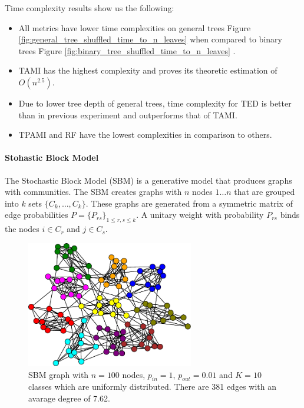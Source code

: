 Time complexity results show us the following:

\begin{itemize}
	\item All metrics have lower time complexities on general trees Figure \ref{fig:general_tree_shuffled_time_to_n_leaves} when compared to binary trees Figure \ref{fig:binary_tree_shuffled_time_to_n_leaves} .
	\item TAMI has the highest complexity and proves its theoretic estimation of $O(n^{2.5})$.
	\item Due to lower tree depth of general trees, time complexity for TED is better than in previous experiment and outperforms that of TAMI.  
	\item TPAMI and RF have the lowest complexities in comparison to others.
\end{itemize}

\paragraph{Stohastic Block Model}
\label{experiment_sbm}

The Stochastic Block Model (SBM) is a generative model that produces graphs with communities. The SBM creates graphs with $n$ nodes $1 \dots n$ that are grouped into $k$ sets $\{C_k, \dots, C_k\}$.
These graphs are generated from a symmetric matrix of edge probabilities $P = \{P_{rs} \}_{1\leq r,s \leq k}$. A unitary weight with probability $P_{rs}$ binds the nodes $i \in C_r$ and $j \in C_s$. 

\begin{figure}[H]
	\begin{center}
		\includegraphics[width=0.65\textwidth]{figures/2-block-model-sbm-graph.pdf}
		\caption{SBM graph with $n=100$ nodes, $p_{in}=1$, $p_{out}=0.01$ and $K=10$ classes which are uniformly distributed. There are 381 edges with an avarage degree of 7.62.}
		\label{fig:sbm_graph}
	\end{center}
\end{figure}

